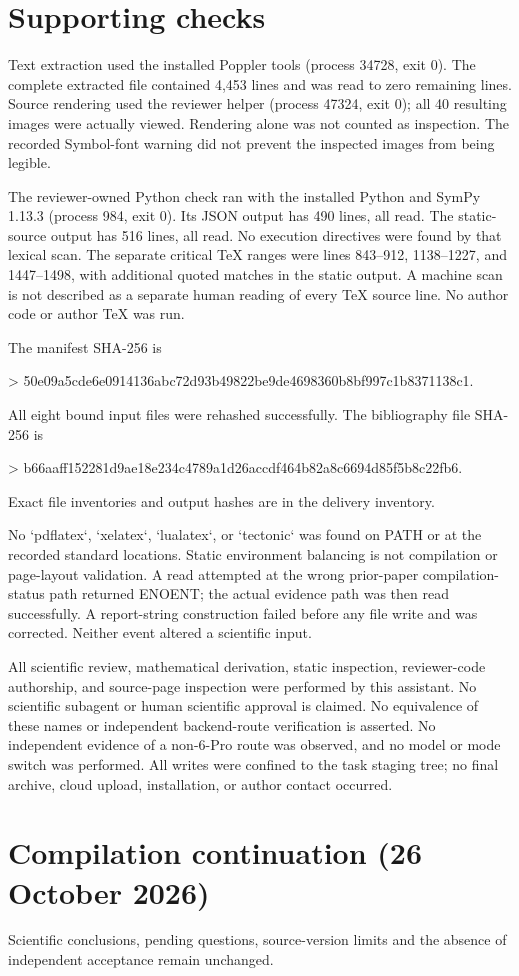 \documentclass[10pt]{article}
\begin{document}
\section*{Supporting checks}
Text extraction used the installed Poppler tools (process 34728, exit 0). The complete extracted file contained 4,453 lines and was read to zero remaining lines. Source rendering used the reviewer helper (process 47324, exit 0); all 40 resulting images were actually viewed. Rendering alone was not counted as inspection. The recorded Symbol-font warning did not prevent the inspected images from being legible.\par
The reviewer-owned Python check ran with the installed Python and SymPy 1.13.3 (process 984, exit 0). Its JSON output has 490 lines, all read. The static-source output has 516 lines, all read. No execution directives were found by that lexical scan. The separate critical TeX ranges were lines 843–912, 1138–1227, and 1447–1498, with additional quoted matches in the static output. A machine scan is not described as a separate human reading of every TeX source line. No author code or author TeX was run.\par
The manifest SHA-256 is\par
> 50e09a5cde6e0914136abc72d93b49822be9de4698360b8bf997c1b8371138c1.\par
All eight bound input files were rehashed successfully. The bibliography file SHA-256 is\par
> b66aaff152281d9ae18e234c4789a1d26accdf464b82a8c6694d85f5b8c22fb6.\par
Exact file inventories and output hashes are in the delivery inventory.\par
No `pdflatex`, `xelatex`, `lualatex`, or `tectonic` was found on PATH or at the recorded standard locations. Static environment balancing is not compilation or page-layout validation. A read attempted at the wrong prior-paper compilation-status path returned ENOENT; the actual evidence path was then read successfully. A report-string construction failed before any file write and was corrected. Neither event altered a scientific input.\par
All scientific review, mathematical derivation, static inspection, reviewer-code authorship, and source-page inspection were performed by this assistant. No scientific subagent or human scientific approval is claimed. No equivalence of these names or independent backend-route verification is asserted. No independent evidence of a non-6-Pro route was observed, and no model or mode switch was performed. All writes were confined to the task staging tree; no final archive, cloud upload, installation, or author contact occurred.\par
\section*{Compilation continuation (26 October 2026)}
Scientific conclusions, pending questions, source-version limits and the absence of independent acceptance remain unchanged.\par
\end{document}

